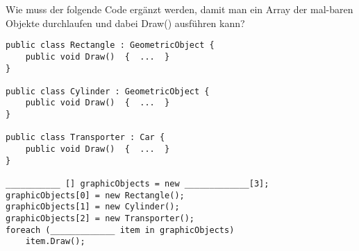 Wie muss der folgende Code ergänzt werden, damit man ein Array der mal-baren Objekte durchlaufen und dabei Draw() ausführen kann? 

\begin{lstlisting}[language={[Sharp]C}]
public class Rectangle : GeometricObject {
	public void Draw()  {  ...  }
}

public class Cylinder : GeometricObject {
	public void Draw()  {  ...  }
}

public class Transporter : Car {
	public void Draw()  {  ...  }
}

___________ [] graphicObjects = new _____________[3];
graphicObjects[0] = new Rectangle();
graphicObjects[1] = new Cylinder();
graphicObjects[2] = new Transporter();
foreach (_____________ item in graphicObjects)
	item.Draw();
\end{lstlisting}